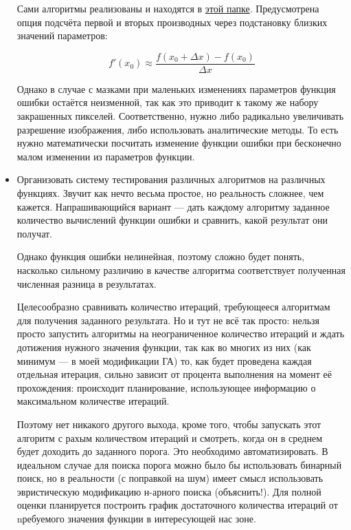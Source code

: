 \documentclass[11pt]{article}
\begin{document}
\begin{itemize}
                Сами алгоритмы реализованы и находятся в \href{https://github.com/donRumata03/PowerfulGA/blob/master/other_optimization/local_optimization.cpp}{этой папке}.
                Предусмотрена опция подсчёта первой и вторых производных через подстановку близких значений параметров:

                \begin{equation}
                    f'(x_0) \approx \frac{f(x_0 + \Delta x) - f(x_0)}{\Delta x}
                \end{equation}

                Однако в случае с мазками при маленьких изменениях параметров функция ошибки остаётся неизменной, так как это приводит к такому же набору закрашенных пикселей.
                Соответственно, нужно либо радикально увеличивать разрешение изображения, либо использовать аналитические методы.
                То есть нужно математически посчитать изменение функции ошибки при бесконечно малом изменении из параметров функции.

        \item \label{item:testing_system} Организовать систему тестирования различных алгоритмов на различных функциях.
        Звучит как нечто весьма простое, но реальность сложнее, чем кажется.
        Напрашивающийся вариант — дать каждому алгоритму заданное количество вычислений функции ошибки и сравнить, какой результат они получат.

        Однако функция ошибки нелинейная, поэтому сложно будет понять,
        насколько сильному различию в качестве алгоритма соответствует полученная численная разница в результатах.

        Целесообразно сравнивать количество итераций, требующееся алгоритмам для получения заданного результата.
        Но и тут не всё так просто: нельзя просто запустить алгоритмы на неограниченное количество итераций
        и ждать дотижения нужного значения функции,
        так как во многих из них (как минимум — в моей модификации ГА) то,
        как будет проведена каждая отдельная итерация, сильно зависит от процента выполнения на момент её прохождения:
        происходит планирование,  использующее информацию о максимальном количестве итераций.


        Поэтому нет никакого другого выхода, кроме того, чтобы запускать этот алгоритм с рахым количеством итераций и смотреть, когда он в среднем будет доходить до заданного порога.
        Это необходимо автоматизировать.
        В идеальном случае для поиска порога можно было бы использовать бинарный поиск, но в реальности (с поправкой на шум) имеет смысл использовать эвристическую модификацию н-арного поиска (объяснить!).
        Для полной оценки планируется построить график достаточного количества итераций от nребуемого значения функции в интересующей нас зоне.


\end{itemize}
\end{document}
